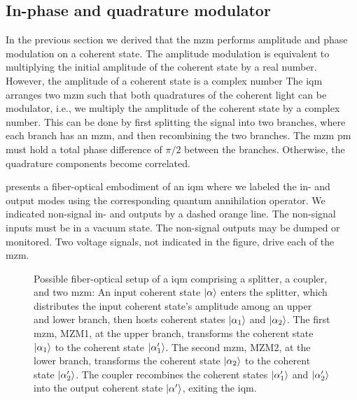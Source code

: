 \subsection{In-phase and quadrature modulator}

In the previous section we derived that the \gls{mzm} performs amplitude and phase modulation on a coherent state.
The amplitude modulation is equivalent to multiplying the initial amplitude of the coherent state by a real number.
However, the amplitude of a coherent state is a complex number
The \gls{iqm} arranges two \gls{mzm} such that both quadratures of the coherent light can be modulator, i.e., we multiply the amplitude of the coherent state by a complex number.
This can be done by first splitting the signal into two branches, where each branch has an \gls{mzm}, and then recombining the two branches.
The \gls{mzm} \gls{pm} must hold a total phase difference of $\pi/2$ between the branches.
Otherwise, the quadrature components become correlated.

 presents a fiber-optical embodiment of an \gls{iqm} where we labeled the in- and output modes using the corresponding quantum annihilation operator.
We indicated non-signal in- and outputs by a dashed orange line.
The non-signal inputs must be in a vacuum state.
The non-signal outputs may be dumped or monitored.
Two voltage signals, not indicated in the figure, drive each of the \gls{mzm}.
\begin{figure}[htb]
	\centering
	
	\caption{Possible fiber-optical setup of a \gls{iqm} comprising a splitter, a coupler, and two \gls{mzm}: An input coherent state $\ket{\alpha}$ enters the splitter, which distributes the input coherent state's amplitude among an upper and lower branch, then hosts coherent states $\ket{\alpha_1}$ and $\ket{\alpha_2}$. The first \gls{mzm}, MZM1, at the upper branch, transforms the coherent state $\ket{\alpha_1}$ to the coherent state $\ket{\alpha_1^\prime}$. The second \gls{mzm}, MZM2, at the lower branch, transforms the coherent state $\ket{\alpha_2}$ to the coherent state $\ket{\alpha_2^\prime}$. The coupler recombines the coherent states $\ket{\alpha_1^\prime}$ and $\ket{\alpha_2^\prime}$ into the output coherent state $\ket{\alpha^\prime}$, exiting the \gls{iqm}.}\label{fig:iqm}
\end{figure}

